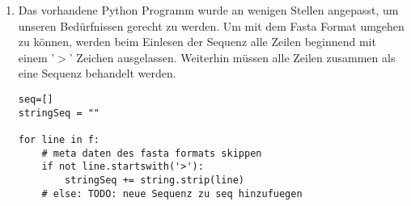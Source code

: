 \documentclass{homework}
\date{Montag, dem 10. Dezember 2012}
\author{Stefan Meißner (4279113) und Niels Hoppe (4356370)}
\begin{document}
\maketitle
\begin{enumerate} 


%
%
%
%
%
%
%
%
%
%
\begin{enumerate}
\item Das vorhandene Python Programm wurde an wenigen Stellen angepasst, um unseren Bedürfnissen gerecht zu werden. Um mit dem Fasta Format umgehen zu können, werden beim Einlesen der Sequenz alle Zeilen beginnend mit einem '$>$' Zeichen ausgelassen. 
Weiterhin müssen alle Zeilen zusammen als eine Sequenz behandelt werden.
\begin{verbatim}
seq=[]
stringSeq = ""

for line in f:
    # meta daten des fasta formats skippen
    if not line.startswith('>'):
        stringSeq += string.strip(line)
    # else: TODO: neue Sequenz zu seq hinzufuegen


\end{verbatim}
\end{enumerate}
\end{enumerate}
\end{document}

